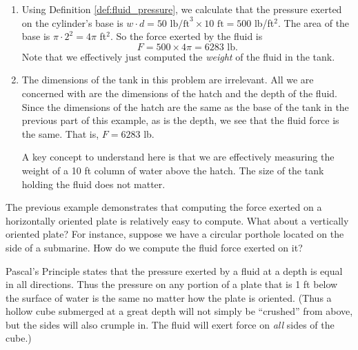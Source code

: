 {\begin{enumerate}
	\item	Using Definition \ref{def:fluid_pressure}, we calculate that the pressure exerted on the cylinder's base is $w\cdot d = 50 \text{ lb/ft}^3\times 10\text{ ft} = 500$ lb/ft$^2$. The area of the base is $\pi\cdot 2^2 = 4\pi$ ft$^2$. So the force exerted by the fluid is 
	$$F = 500\times 4\pi = 6283\text{ lb}.$$
Note that we effectively just computed the \textit{weight} of the fluid in the tank.

	\item		The dimensions of the tank in this problem are irrelevant. All we are concerned with are the dimensions of the hatch and the depth of the fluid. Since the dimensions of the hatch are the same as the base of the tank in the previous part of this example, as is the depth, we see that the fluid force is the same. That is, $F = 6283$ lb. 
	
	A key concept to understand here is that we are effectively measuring the weight of a 10 ft column of water above the hatch. The size of the tank holding the fluid does not matter.
\end{enumerate}}

The previous example demonstrates that computing the force exerted on a horizontally oriented plate is relatively easy to compute. What about a vertically oriented plate? For instance, suppose we have a circular porthole located on the side of a submarine. How do we compute the fluid force exerted on it?

Pascal's Principle states  that the pressure exerted by a fluid at a depth is equal in all directions. Thus the pressure on any portion of a plate that is 1 ft below the surface of water is the same no matter how the plate is oriented. (Thus a hollow cube submerged at a great depth will not simply be ``crushed'' from above, but the sides will also crumple in. The fluid will exert force on \textit{all} sides of the cube.)

